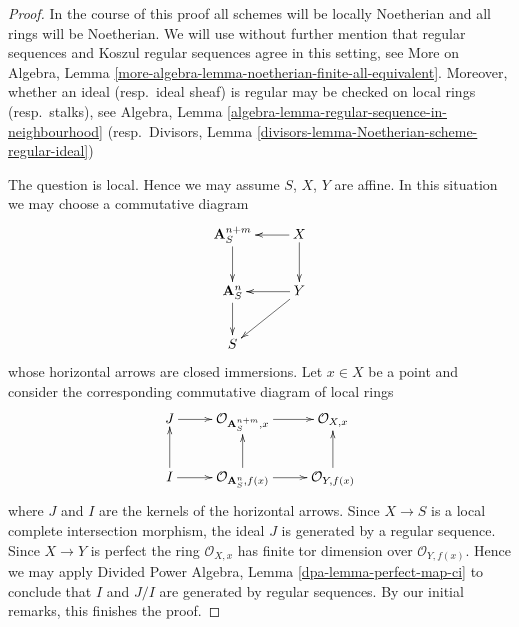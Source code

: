 \documentclass[10pt,a4paper]{amsart}
\theoremstyle{plain}
\theoremstyle{definition}
\theoremstyle{remark}
\numberwithin{equation}{subsection}
\begin{document}
\begin{proof}
In the course of this proof all schemes will be locally Noetherian
and all rings will be Noetherian. We will use without further mention
that regular sequences and Koszul regular sequences agree in this
setting, see More on Algebra, Lemma
\ref{more-algebra-lemma-noetherian-finite-all-equivalent}.
Moreover, whether an ideal (resp.\ ideal sheaf) is regular
may be checked on local rings (resp.\ stalks), see
Algebra, Lemma \ref{algebra-lemma-regular-sequence-in-neighbourhood}
(resp.\ Divisors, Lemma \ref{divisors-lemma-Noetherian-scheme-regular-ideal})

\medskip\noindent
The question is local. Hence we may assume $S$, $X$, $Y$ are
affine. In this situation we may choose a commutative diagram
$$
\xymatrix{
\mathbf{A}^{n + m}_S \ar[d] & X \ar[l] \ar[d] \\
\mathbf{A}^n_S \ar[d] & Y \ar[l] \ar[ld] \\
S
}
$$
whose horizontal arrows are closed immersions. Let $x \in X$ be a
point and consider the corresponding commutative diagram of local
rings
$$
\xymatrix{
J \ar[r] &
\mathcal{O}_{\mathbf{A}^{n + m}_S, x} \ar[r] &
\mathcal{O}_{X, x} \\
I \ar[r] \ar[u] &
\mathcal{O}_{\mathbf{A}^n_S, f(x)} \ar[r] \ar[u] &
\mathcal{O}_{Y, f(x)} \ar[u]
}
$$
where $J$ and $I$ are the kernels of the horizontal arrows.
Since $X \to S$ is a local complete intersection morphism, the
ideal $J$ is generated by a regular sequence. Since $X \to Y$ is
perfect the ring $\mathcal{O}_{X, x}$ has finite tor dimension over
$\mathcal{O}_{Y, f(x)}$. Hence we may apply
Divided Power Algebra, Lemma \ref{dpa-lemma-perfect-map-ci}
to conclude that $I$ and $J/I$ are generated by regular sequences.
By our initial remarks, this finishes the proof.
\end{proof}
\end{document}
